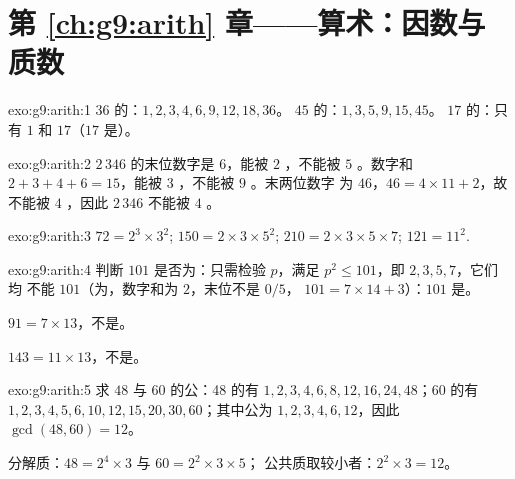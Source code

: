 \section*{第 \ref{ch:g9:arith} 章——算术：因数与质数}

\begin{solution}{exo:g9:arith:1}
$36$ 的：$1, 2, 3, 4, 6, 9, 12, 18, 36$。
$45$ 的：$1, 3, 5, 9, 15, 45$。
$17$ 的：只有 $1$ 和 $17$（$17$ 是）。
\end{solution}

\begin{solution}{exo:g9:arith:2}
$2\,346$ 的末位数字是 $6$，能被 $2$ ，不能被 $5$ 。数字和
$2 + 3 + 4 + 6 = 15$，能被 $3$ ，不能被 $9$ 。末两位数字
为 $46$，$46 = 4 \times 11 + 2$，故不能被 $4$ ，因此 $2\,346$
不能被 $4$ 。
\end{solution}

\begin{solution}{exo:g9:arith:3}
$72 = 2^3 \times 3^2$; \quad
$150 = 2 \times 3 \times 5^2$; \quad
$210 = 2 \times 3 \times 5 \times 7$; \quad
$121 = 11^2$.
\end{solution}

\begin{solution}{exo:g9:arith:4}
判断 $101$ 是否为：只需检验 $p$，满足 $p^2 \leq 101$，即 $2, 3, 5, 7$，它们均
不能 $101$（为，数字和为 $2$，末位不是 $0/5$，
$101 = 7 \times 14 + 3$）：$101$ 是。

$91 = 7 \times 13$，不是。

$143 = 11 \times 13$，不是。
\end{solution}

\begin{solution}{exo:g9:arith:5}
求 $48$ 与 $60$ 的公：48 的有 $1, 2, 3, 4, 6, 8,\allowbreak
12, 16, 24, 48$；$60$ 的有 $1, 2, 3, 4, 5, 6, 10, 12, 15, 20,\allowbreak
30, 60$；其中公为 $1, 2, 3, 4, 6, 12$，因此 $\gcd(48,60) = 12$。

分解质：$48 = 2^4 \times 3$ 与 $60 = 2^2 \times 3 \times 5$；
公共质取较小者：$2^2 \times 3 = 12$。
\end{solution}

